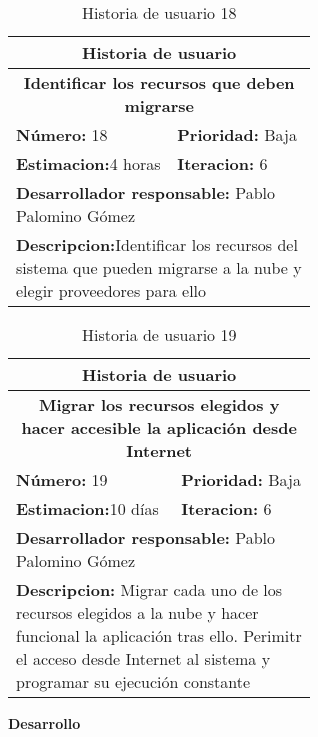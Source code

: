 \begin{table}[H]
        \centering
        \begin{tabular}{|p{0.3\linewidth}|p{0.3\linewidth}|}
          \hline
          \multicolumn{2}{|c|}{Historia de usuario}\\ \hline
          \multicolumn{2}{|c|}{\textbf{Identificar los recursos que deben migrarse}}\\ \hline
          \textbf{Número:} 18 & \textbf{Prioridad:} Baja\\ \hline
          \textbf{Estimacion:}4 horas & \textbf{Iteracion:} 6\\ \hline
          \multicolumn{2}{|l|}{\textbf{Desarrollador responsable:} Pablo Palomino Gómez}\\ \hline
          \multicolumn{2}{|p{0.6\linewidth}|}{\textbf{Descripcion:}Identificar los recursos del sistema que pueden migrarse a la nube y elegir proveedores para ello}\\ \hline
        \end{tabular}
        \caption{Historia de usuario 18}
        \label{tab:hist18}
\end{table}
\begin{table}[H]
        \centering
        \begin{tabular}{|p{0.3\linewidth}|p{0.3\linewidth}|}
          \hline
          \multicolumn{2}{|c|}{Historia de usuario}\\ \hline
          \multicolumn{2}{|c|}{\textbf{Migrar los recursos elegidos y hacer accesible la aplicación desde Internet}}\\ \hline
          \textbf{Número:} 19 & \textbf{Prioridad:} Baja\\ \hline
          \textbf{Estimacion:}10 días & \textbf{Iteracion:} 6\\ \hline
          \multicolumn{2}{|l|}{\textbf{Desarrollador responsable:} Pablo Palomino Gómez}\\ \hline
          \multicolumn{2}{|p{0.6\linewidth}|}{\textbf{Descripcion:} Migrar cada uno de los recursos elegidos a la nube y hacer funcional la aplicación tras ello. Perimitr el acceso desde Internet al sistema y programar su ejecución constante}\\ \hline
        \end{tabular}
        \caption{Historia de usuario 19}
        \label{tab:hist19}
\end{table}
\textbf{Desarrollo}\\


